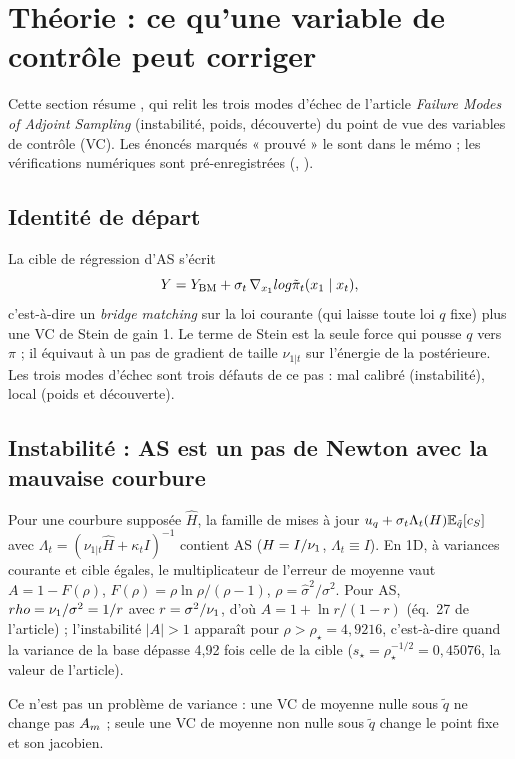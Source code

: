 \section{Théorie : ce qu'une variable de contrôle peut corriger}
\label{sec:theorie}

Cette section résume , qui relit les trois modes d'échec de l'article \emph{Failure Modes of Adjoint Sampling} (instabilité, poids, découverte) du point de vue des variables de contrôle (VC). Les énoncés marqués « prouvé » le sont dans le mémo ; les vérifications numériques sont pré-enregistrées (, ).

\subsection{Identité de départ}
La cible de régression d'AS s'écrit
\[
  Y = Y_{\rm BM}+\sigma_t\,\nabla_{x_1}\log\tilde\pi_t(x_1\mid x_t),
\]
c'est-à-dire un \emph{bridge matching} sur la loi courante (qui laisse toute loi $q$ fixe) plus une VC de Stein de gain 1. Le terme de Stein est la seule force qui pousse $q$ vers $\pi$ ; il équivaut à un pas de gradient de taille $\nu_{1|t}$ sur l'énergie de la postérieure. Les trois modes d'échec sont trois défauts de ce pas : mal calibré (instabilité), local (poids et découverte).

\subsection{Instabilité : AS est un pas de Newton avec la mauvaise courbure}
\begin{proposition}[prouvé]
Pour une courbure supposée $\hat H$, la famille de mises à jour $u_q+\sigma_t\Lambda_t(\hat H)\E_{\tilde q}[c_S]$ avec $\Lambda_t=(\nu_{1|t}\hat H+\kappa_tI)^{-1}$ contient AS ($\hat H=I/\nuone$, $\Lambda_t\equiv I$). En 1D, à variances courante et cible égales, le multiplicateur de l'erreur de moyenne vaut $A=1-F(\rho)$, $F(\rho)=\rho\ln\rho/(\rho-1)$, $\rho=\hat\sigma^2/\sigma^2$. Pour AS, $\rho=\nuone/\sigma^2=1/r$ avec $r=\sigma^2/\nuone$, d'où $A=1+\ln r/(1-r)$ (éq.~27 de l'article) ; l'instabilité $|A|>1$ apparaît pour $\rho>\rho_\star=4{,}9216$, c'est-à-dire quand la variance de la base dépasse 4,92 fois celle de la cible ($s_\star=\rho_\star^{-1/2}=0{,}45076$, la valeur de l'article).
\end{proposition}
Ce n'est pas un problème de variance : une VC de moyenne nulle sous $\tilde q$ ne change pas $\Am$ ; seule une VC de moyenne non nulle sous $\tilde q$ change le point fixe et son jacobien.

